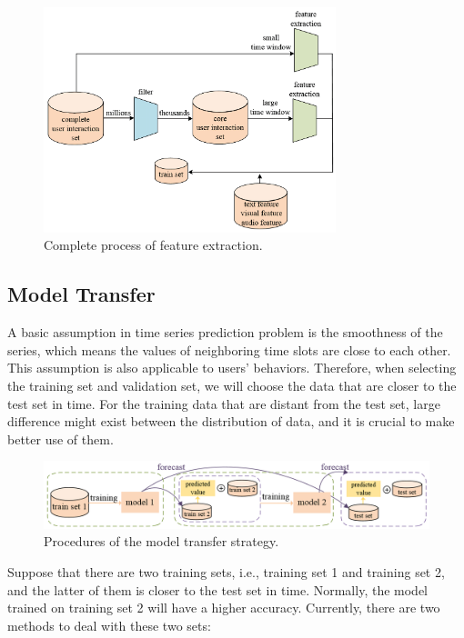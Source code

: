 \documentclass{article}
\begin{document}
\begin{figure}[h]
  \centering
  \includegraphics[width=8.5cm]{media/feat-extraction}
  \caption{Complete process of feature extraction.}
  \label{fig:feat-extraction}
\end{figure}


\subsection{Model Transfer}
\label{sec:model-transfer}

A basic assumption in time series prediction problem is the smoothness of the series, which means the values of neighboring time slots are close to each other. This assumption is also applicable to users' behaviors. Therefore, when selecting the training set and validation set, we will choose the data that are closer to the test set in time. For the training data that are distant from the test set, large difference might exist between the distribution of data, and it is crucial to make better use of them.

\begin{figure}[h!]
  \centering
  \includegraphics[width=17.3cm]{media/model-transfer}
  \caption{Procedures of the model transfer strategy.}
  \label{fig:model-transfer}
\end{figure}

Suppose that there are two training sets, i.e., training set 1 and training set 2, and the latter of them is closer to the test set in time. Normally, the model trained on training set 2 will have a higher accuracy. Currently, there are two methods to deal with these two sets:
\end{document}
